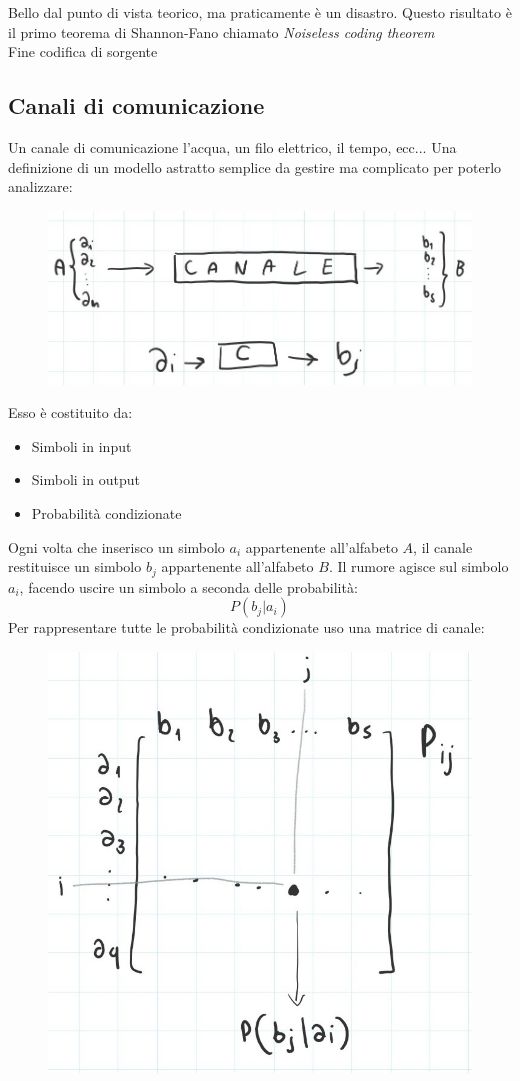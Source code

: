 Bello dal punto di vista teorico, ma praticamente è un disastro.
Questo risultato è il primo teorema di Shannon-Fano chiamato \textit{Noiseless coding theorem}\\
Fine codifica di sorgente

\newpage

\subsection*{Canali di comunicazione}

Un canale di comunicazione l'acqua, un filo elettrico, il tempo, ecc...
Una definizione di un modello astratto semplice da gestire ma complicato per poterlo analizzare:
\begin{figure}[h]
	\centering
	\includegraphics[width=0.8\linewidth]{immagini/img26}
\end{figure}
Esso è costituito da:
\begin{itemize}
	\item Simboli in input
	\item Simboli in output
	\item Probabilità condizionate
\end{itemize}
Ogni volta che inserisco un simbolo $a_i$ appartenente all'alfabeto $A$, il canale restituisce un simbolo $b_j$ appartenente all'alfabeto $B$.
Il rumore agisce sul simbolo $a_i$, facendo uscire un simbolo a seconda delle probabilità:
\begin{equation*}
P(b_j|a_i)
\end{equation*}
Per rappresentare tutte le probabilità condizionate uso una matrice di canale:

\begin{figure}[h]
	\centering
	\includegraphics[width=0.57\linewidth]{immagini/img27}
\end{figure}

